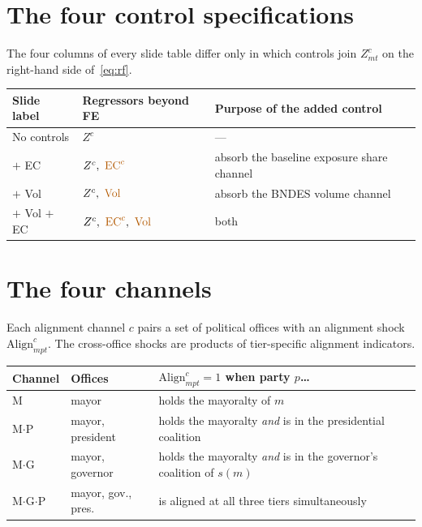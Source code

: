 \documentclass{article}
\newcommand{\tog}[1]{\textcolor{toggle}{#1}}
\newcommand{\Align}{\mathrm{Align}}
\newcommand{\EC}{\mathrm{EC}}
\newcommand{\Vol}{\mathrm{Vol}}
\begin{document}
\section{The four control specifications}\label{sec:specs}

The four columns of every slide table differ only in which controls join
$Z^{c}_{mt}$ on the right-hand side of~\eqref{eq:rf}.

\begin{center}
\begin{tabular}{lll}
\toprule
Slide label & Regressors beyond FE & Purpose of the added control \\
\midrule
No controls   & $Z^{c}$                                & --- \\
$+$ EC        & $Z^{c},\ \tog{\EC^{c}}$                & absorb the baseline exposure share channel \\
$+$ Vol       & $Z^{c},\ \tog{\Vol}$                   & absorb the BNDES volume channel \\
$+$ Vol $+$ EC& $Z^{c},\ \tog{\EC^{c}},\ \tog{\Vol}$   & both \\
\bottomrule
\end{tabular}
\end{center}

\section{The four channels}\label{sec:channels}

Each alignment channel $c$ pairs a set of political offices with an alignment shock
$\Align^{c}_{mpt}$. The cross-office shocks are products of tier-specific
alignment indicators.

\begin{center}
\begin{tabular}{lll}
\toprule
Channel & Offices & $\Align^{c}_{mpt}=1$ when party $p$\ldots \\
\midrule
M       & mayor                  & holds the mayoralty of $m$ \\
M$\cdot$P   & mayor, president   & holds the mayoralty \emph{and} is in the presidential coalition \\
M$\cdot$G   & mayor, governor    & holds the mayoralty \emph{and} is in the governor's coalition of $s(m)$ \\
M$\cdot$G$\cdot$P & mayor, gov., pres. & is aligned at all three tiers simultaneously \\
\bottomrule
\end{tabular}
\end{center}
\end{document}
